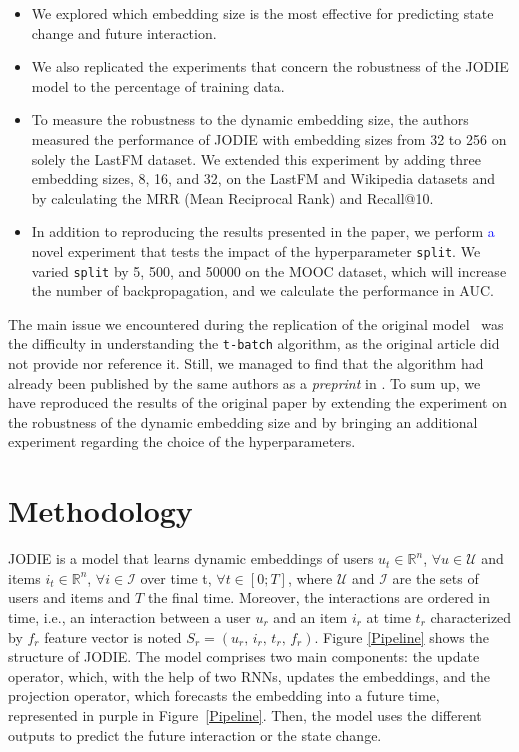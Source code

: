 \begin{itemize}
    \item We explored which embedding size is the most effective for predicting state change and future interaction.
    \item We also replicated the experiments that concern the robustness of the JODIE model to the percentage of training data.
    \item To measure the robustness to the dynamic embedding size, 
    the authors measured the performance of JODIE with embedding sizes from 32 to 256 on solely the LastFM dataset. We extended this experiment by adding three embedding sizes, 8, 16, and 32, on the LastFM and Wikipedia datasets and by calculating the MRR (Mean Reciprocal Rank) and Recall@10.

\item In addition to reproducing the results presented in the paper, we perform \textcolor{blue}{a} novel experiment that tests the impact of the hyperparameter \texttt{split}. We varied \texttt{split} by 5, 500, and 50000 on the MOOC dataset, which will increase the number of backpropagation, and we calculate the performance in AUC. 
\end{itemize}
The main issue we encountered during the replication of the original model~\cite{kumar2019predicting} was the difficulty in understanding the \texttt{t-batch} algorithm, as the original article did not provide nor reference it. Still, we managed to find that the algorithm had already been published  by the same authors as a \textit{preprint} in \cite{kumar18}. To sum up, we have reproduced the results of the original paper by extending the experiment on the robustness of the dynamic embedding size and by bringing an additional experiment regarding the choice of the hyperparameters.

\section{Methodology}
JODIE is a model that learns dynamic embeddings of users $u_t \in \mathbb{R}^n$, $\forall u \in \mathcal{U}$ and items $i_t \in \mathbb{R}^n$, $\forall i \in \mathcal{I}$ over time t, $\forall t \in [0; T]$, where $\mathcal{U}$ and $\mathcal{I}$ are the sets of users and items and $T$ the final time. Moreover, the interactions are ordered in time, i.e., an interaction between a user $u_r$ and an item $i_r$ at time $t_r$ characterized by $f_r$ feature vector is noted $S_r = (u_r, \, i_r, \, t_r, \, f_r)$. Figure \ref{Pipeline} shows the structure of JODIE. The model comprises two main components: the update operator, which, with the help of two RNNs, updates the embeddings, and the projection operator, which forecasts the embedding into a future time, represented in purple in %
Figure~\ref{Pipeline}. Then, the model uses the different outputs to predict the future interaction or the state change.

